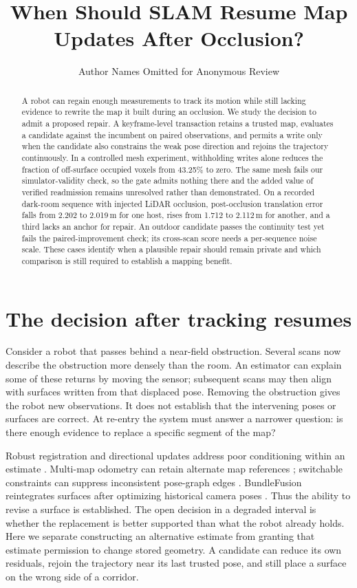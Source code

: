 \documentclass[conference]{IEEEtran}
\begin{document}
\title{When Should SLAM Resume Map Updates After Occlusion?}
\author{Author Names Omitted for Anonymous Review}
\maketitle
\begin{abstract}
A robot can regain enough measurements to track its motion while still lacking evidence to rewrite the map it built during an occlusion. We study the decision to admit a proposed repair. A keyframe-level transaction retains a trusted map, evaluates a candidate against the incumbent on paired observations, and permits a write only when the candidate also constrains the weak pose direction and rejoins the trajectory continuously. In a controlled mesh experiment, withholding writes alone reduces the fraction of off-surface occupied voxels from 43.25\% to zero. The same mesh fails our simulator-validity check, so the gate admits nothing there and the added value of verified readmission remains unresolved rather than demonstrated. On a recorded dark-room sequence with injected LiDAR occlusion, post-occlusion translation error falls from 2.202 to 2.019\,m for one host, rises from 1.712 to 2.112\,m for another, and a third lacks an anchor for repair. An outdoor candidate passes the continuity test yet fails the paired-improvement check; its cross-scan score needs a per-sequence noise scale. These cases identify when a plausible repair should remain private and which comparison is still required to establish a mapping benefit.
\end{abstract}
\IEEEpeerreviewmaketitle

\section{The decision after tracking resumes}
Consider a robot that passes behind a near-field obstruction. Several scans now describe the obstruction more densely than the room. An estimator can explain some of these returns by moving the sensor; subsequent scans may then align with surfaces written from that displaced pose. Removing the obstruction gives the robot new observations. It does not establish that the intervening poses or surfaces are correct. At re-entry the system must answer a narrower question: is there enough evidence to replace a specific segment of the map?

Robust registration and directional updates address poor conditioning within an estimate \cite{zhang2016degeneracy,tuna2024xicp}. Multi-map odometry can retain alternate map references \cite{ma2025mmlins}; switchable constraints can suppress inconsistent pose-graph edges \cite{sunderhauf2012switchable}. BundleFusion reintegrates surfaces after optimizing historical camera poses \cite{dai2017bundlefusion}. Thus the ability to revise a surface is established. The open decision in a degraded interval is whether the replacement is better supported than what the robot already holds. Here we separate constructing an alternative estimate from granting that estimate permission to change stored geometry. A candidate can reduce its own residuals, rejoin the trajectory near its last trusted pose, and still place a surface on the wrong side of a corridor.
\end{document}

